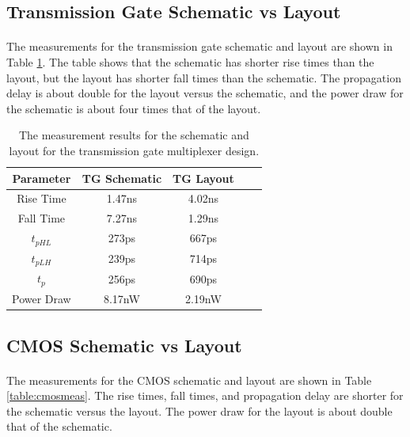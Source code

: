 \documentclass{article}
\begin{document}
  \subsection{Transmission Gate Schematic vs Layout}
    \paragraph{}
    The measurements for the transmission gate schematic and layout are shown in Table \ref{table:tgmeas}. The table shows that the schematic has shorter rise times than the layout, but the layout has shorter fall times than the schematic. The propagation delay is about double for the layout versus the schematic, and the power draw for the schematic is about four times that of the layout.

    \begin{table}[H]
      \centering
      \footnotesize
      \begin{tabular}{|c|c|c|c|c|}
        \hline
        \textbf{Parameter} & \textbf{TG Schematic} & \textbf{TG Layout}\\
        \hline
        Rise Time & 1.47ns & 4.02ns\\
        \hline
        Fall Time & 7.27ns & 1.29ns\\
        \hline
        $t_{pHL}$ & 273ps & 667ps\\
        \hline
        $t_{pLH}$ & 239ps & 714ps\\
        \hline
        $t_{p}$ & 256ps & 690ps\\
        \hline
        Power Draw & 8.17nW & 2.19nW \\
       \hline
      \end{tabular}
      \caption{The measurement results for the schematic and layout for the transmission gate multiplexer design.}
      \label{table:tgmeas}
    \end{table}

  \subsection{CMOS Schematic vs Layout}
    \paragraph{}
    The measurements for the CMOS schematic and layout are shown in Table \ref{table:cmosmeas}. The rise times, fall times, and propagation delay are shorter for the schematic versus the layout. The power draw for the layout is about double that of the schematic. 
\end{document}
